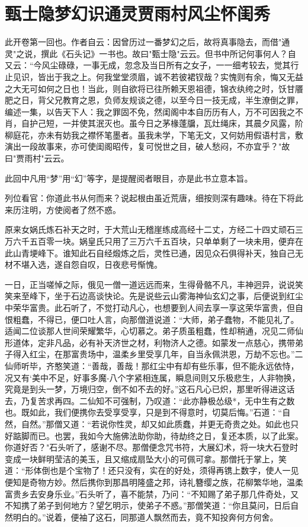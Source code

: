 \setlength{\columnsep}{3em}
\tableofcontents


\cleardoublepage
{}
\chapter{甄士隐梦幻识通灵\ttlbreak 贾雨村风尘怀闺秀}


此开卷第一回也。作者自云：因曾历过一番梦幻之后，故将真事隐去，而借"通灵"之说，撰此《石头记》一书也。故曰"甄士隐"云云。但书中所记何事何人？自又云：“今风尘碌碌，一事无成，忽念及当日所有之女子，一一细考较去，觉其行止见识，皆出于我之上。何我堂堂须眉，诚不若彼裙钗哉？实愧则有余，悔又无益之大无可如何之日也！当此，则自欲将已往所赖天恩祖德，锦衣纨绔之时，饫甘餍肥之日，背父兄教育之恩，负师友规谈之德，以至今日一技无成，半生潦倒之罪，编述一集，以告天下人：我之罪固不免，然闺阁中本自历历有人，万不可因我之不肖，自护己短，一并使其泯灭也。虽今日之茅椽蓬牖，瓦灶绳床，其晨夕风露，阶柳庭花，亦未有妨我之襟怀笔墨者。虽我未学，下笔无文，又何妨用假语村言，敷演出一段故事来，亦可使闺阁昭传，复可悦世之目，破人愁闷，不亦宜乎？"故曰"贾雨村"云云。

此回中凡用“梦”用“幻”等字，是提醒阅者眼目，亦是此书立意本旨。

列位看官：你道此书从何而来？说起根由虽近荒唐，细按则深有趣味。待在下将此来历注明，方使阅者了然不惑。

原来女娲氏炼石补天之时，于大荒山无稽崖练成高经十二丈，方经二十四丈顽石三万六千五百零一块。娲皇氏只用了三万六千五百块，只单单剩了一块未用，便弃在此山青埂峰下。谁知此石自经煅炼之后，灵性已通，因见众石俱得补天，独自己无材不堪入选，遂自怨自叹，日夜悲号惭愧。

一日，正当嗟悼之际，俄见一僧一道远远而来，生得骨骼不凡，丰神迥异，说说笑笑来至峰下，坐于石边高谈快论。先是说些云山雾海神仙玄幻之事，后便说到红尘中荣华富贵。此石听了，不觉打动凡心，也想要到人间去享一享这荣华富贵，但自恨粗蠢，不得已，便口吐人言，向那僧道说道：“大师，弟子蠢物，不能见礼了。适闻二位谈那人世间荣耀繁华，心切慕之。弟子质虽粗蠢，性却稍通，况见二师仙形道体，定非凡品，必有补天济世之材，利物济人之德。如蒙发一点慈心，携带弟子得入红尘，在那富贵场中，温柔乡里受享几年，自当永佩洪恩，万劫不忘也。”二仙师听毕，齐憨笑道：“善哉，善哉！那红尘中有却有些乐事，但不能永远依恃，况又有`美中不足，好事多魔-八个字紧相连属，瞬息间则又乐极悲生，人非物换，究竟是到头一梦，万境归空，倒不如不去的好。”这石凡心已炽，那里听得进这话去，乃复苦求再四。二仙知不可强制，乃叹道：“此亦静极怂级*，无中生有之数也。既如此，我们便携你去受享受享，只是到不得意时，切莫后悔。”石道：“自然，自然。”那僧又道：“若说你性灵，却又如此质蠢，并更无奇贵之处。如此也只好踮脚而已。也罢，我如今大施佛法助你助，待劫终之日，复还本质，以了此案。你道好否？"石头听了，感谢不尽。那僧便念咒书符，大展幻术，将一块大石登时变成一块鲜明莹洁的美玉，且又缩成扇坠大小的可佩可拿。那僧托于掌上，笑道：“形体倒也是个宝物了！还只没有，实在的好处，须得再镌上数字，使人一见便知是奇物方妙。然后携你到那昌明隆盛之邦，诗礼簪缨之族，花柳繁华地，温柔富贵乡去安身乐业。”石头听了，喜不能禁，乃问：“不知赐了弟子那几件奇处，又不知携了弟子到何地方？望乞明示，使弟子不惑。”那僧笑道：“你且莫问，日后自然明白的。”说着，便袖了这石，同那道人飘然而去，竟不知投奔何方何舍。

